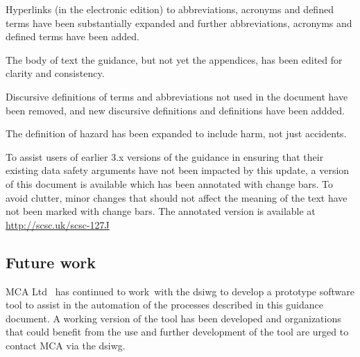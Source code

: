 Hyperlinks (in the electronic edition) to abbreviations, acronyms and defined terms have been substantially expanded and further abbreviations, acronyms and defined terms have been added.

The body of text the guidance, but not yet the appendices, has been edited for clarity and consistency.

Discursive definitions of terms and abbreviations not used in the document have been removed, and new discursive definitions and definitions have been addded.

The definition of hazard has been expanded to include harm, not just accidents.

To assist users of earlier 3.x versions of the guidance in ensuring that their existing data safety arguments have not been impacted by this update, a version of this document is available which has been annotated with change bars. To avoid clutter, minor changes that should not affect the meaning of the text have not been marked with change bars. The annotated version is available at \href{http://scsc.uk/scsc-127I}{http://scsc.uk/scsc-127J}


\subsection*{Future work}

MCA Ltd \cbstart\ has continued to work\cbend\ with the \gls{dsiwg} to develop a prototype software tool to assist in the automation of the processes described in this guidance document.
A working version of the tool has been developed and organizations that could benefit from the use and further development of the tool are urged to contact MCA via the \gls{dsiwg}.

